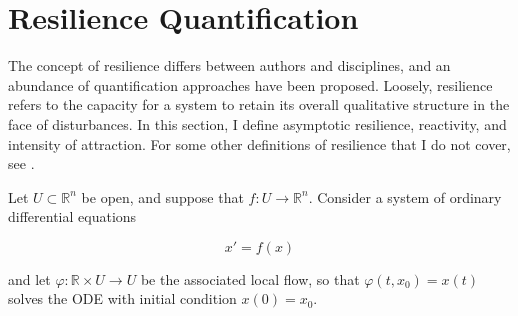 \section{Resilience Quantification}
\label{sec:resilience}

The concept of resilience differs between authors and disciplines, and an abundance of quantification approaches have been proposed. Loosely, resilience refers to the capacity for a system to retain its overall qualitative structure in the face of disturbances. 
%
In this section, I define asymptotic resilience, reactivity, and intensity of attraction. 
%
For some other definitions of resilience that I do not cover, see \cite{meyerMathematicalReviewResilience2016}.



Let $U \subset \mathbb{R}^n$ be open, and suppose that $f : U \to \mathbb{R}^n$. Consider a system of ordinary differential equations 

\begin{equation}
	\label{eqn:ode}
	x' = f(x)
\end{equation}

and let $\varphi: \mathbb{R} \times U \to U$ be the associated local flow, so that $\varphi(t,x_0) = x(t)$ solves the ODE with initial condition $x(0) = x_0$.






